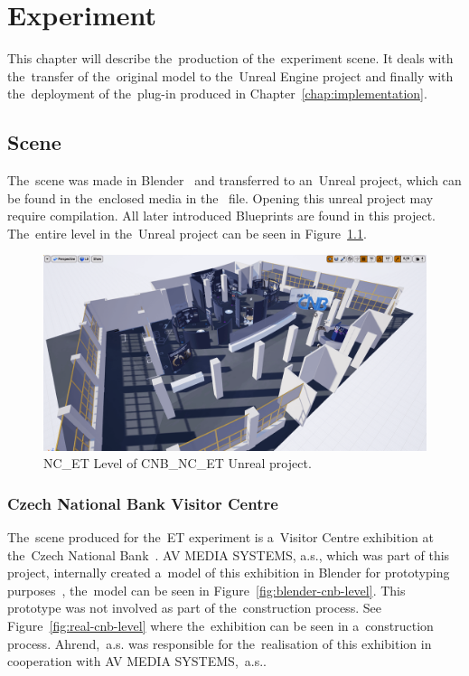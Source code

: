 \chapter{Experiment}
\begin{chapterabstract}
This chapter will describe the~production of the~experiment scene. It deals with the~transfer of the~original model to the~Unreal Engine project and finally with the~deployment of the~plug-in produced in Chapter~\ref{chap:implementation}.
\end{chapterabstract}

\section{Scene}
The~scene was made in Blender~\cite{blender} and transferred to an~Unreal project, which can be found in the~enclosed media in the~ file. Opening this unreal project may require compilation. All later introduced Blueprints are found in this project. The~entire level in the~Unreal project can be seen in Figure~\ref{fig:unreal-cnb-level}.

\begin{figure}[!ht]\centering
    \includegraphics[width=\textwidth]{img/unreal-cnb-scene.png}
    \caption{NC\_ET Level of CNB\_NC\_ET Unreal project.}
    \label{fig:unreal-cnb-level}
\end{figure}

\pagebreak{}
\subsection{Czech National Bank Visitor Centre}
The~scene produced for the~ET experiment is a~Visitor Centre exhibition at the~Czech National Bank~\cite{cnb-nc}. AV MEDIA SYSTEMS, a.s., which was part of this project, internally created a~model of this exhibition in Blender for prototyping purposes~\cite{cnb3dmodel}, the~model can be seen in Figure~\ref{fig:blender-cnb-level}. This prototype was not involved as part of the~construction process. See Figure~\ref{fig:real-cnb-level} where the~exhibition can be seen in a~construction process. Ahrend,~a.s. was responsible for the~realisation of this exhibition in cooperation with AV MEDIA SYSTEMS,~a.s..

